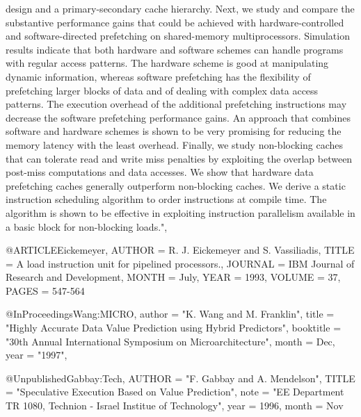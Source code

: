 {                 design and a primary-secondary cache hierarchy. Next,
                 we study and compare the substantive performance gains
                 that could be achieved with hardware-controlled and
                 software-directed prefetching on shared-memory
                 multiprocessors. Simulation results indicate that both
                 hardware and software schemes can handle programs with
                 regular access patterns. The hardware scheme is good at
                 manipulating dynamic information, whereas software
                 prefetching has the flexibility of prefetching larger
                 blocks of data and of dealing with complex data access
                 patterns. The execution overhead of the additional
                 prefetching instructions may decrease the software
                 prefetching performance gains. An approach that
                 combines software and hardware schemes is shown to be
                 very promising for reducing the memory latency with the
                 least overhead. Finally, we study non-blocking caches
                 that can tolerate read and write miss penalties by
                 exploiting the overlap between post-miss computations
                 and data accesses. We show that hardware data
                 prefetching caches generally outperform non-blocking
                 caches. We derive a static instruction scheduling
                 algorithm to order instructions at compile time. The
                 algorithm is shown to be effective in exploiting
                 instruction parallelism available in a basic block for
                 non-blocking loads.",
}

@ARTICLE{Eickemeyer,
	AUTHOR = {R. J. Eickemeyer and S. Vassiliadis},
	TITLE = {A load instruction unit for pipelined processors.},
	JOURNAL = {IBM Journal of Research and Development},
        MONTH = {July},
	YEAR = {1993},
	VOLUME = {37},
	PAGES = {547-564}
}

@InProceedings{Wang:MICRO,
  author =       "K. Wang and M. Franklin",
  title =        "Highly Accurate Data Value Prediction using Hybrid Predictors",
  booktitle =    "30th Annual International Symposium on Microarchitecture",
  month =        Dec,
  year =         "1997",
}


@Unpublished{Gabbay:Tech,
        AUTHOR = "F. Gabbay and A. Mendelson",
        TITLE = "Speculative Execution Based on Value Prediction",
        note = "EE  Department TR 1080, Technion - Israel Institue of Technology",
        year =  1996,
        month = Nov
}



